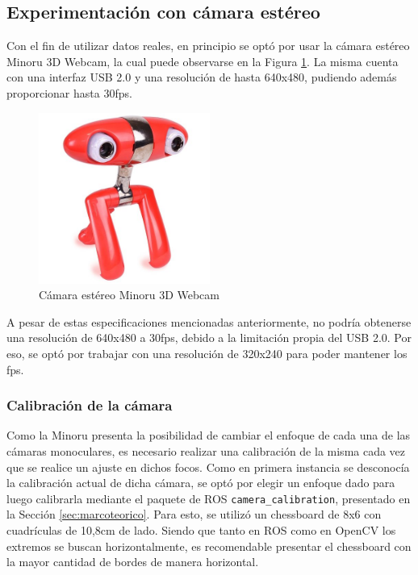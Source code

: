 \subsection{Experimentación con cámara estéreo}
Con el fin de utilizar datos reales, en principio se optó por usar la cámara estéreo Minoru 3D Webcam, la cual puede observarse en la Figura \ref{fig:minoru3dwebcam}. La misma cuenta con una interfaz USB 2.0 y una resolución de hasta 640x480, pudiendo además proporcionar hasta 30fps.
\begin{figure}
    \centering
    \includegraphics[width=0.5\textwidth]{Img/Minoru.jpeg}
    \caption{Cámara estéreo Minoru 3D Webcam}
    \label{fig:minoru3dwebcam}
\end{figure}

A pesar de estas especificaciones mencionadas anteriormente, no podría obtenerse una resolución de 640x480 a 30fps, debido a la limitación propia del USB 2.0. Por eso, se optó por trabajar con una resolución de 320x240 para poder mantener los fps.

\subsubsection{Calibración de la cámara}
Como la Minoru presenta la posibilidad de cambiar el enfoque de cada una de las cámaras monoculares, es necesario realizar una calibración de la misma cada vez que se realice un ajuste en dichos focos. Como en primera instancia se desconocía la calibración actual de dicha cámara, se optó por elegir un enfoque dado para luego calibrarla mediante el paquete de ROS \texttt{camera\_calibration}, presentado en la Sección \ref{sec:marcoteorico}. Para esto, se utilizó un chessboard de 8x6 con cuadrículas de 10,8cm de lado. Siendo que tanto en ROS como en OpenCV los extremos se buscan horizontalmente, es recomendable presentar el chessboard con la mayor cantidad de bordes de manera horizontal.

